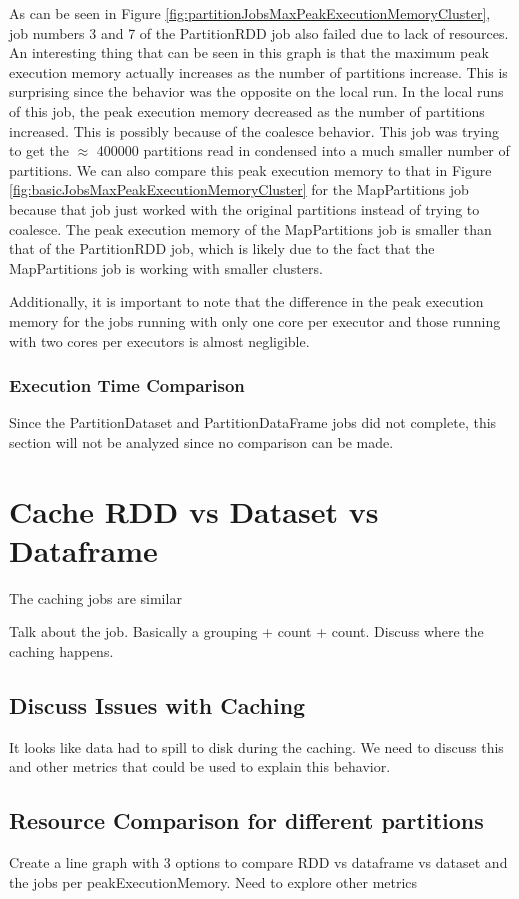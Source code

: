 \documentclass[conference]{IEEEtran}
\begin{document}
As can be seen in Figure \ref{fig:partitionJobsMaxPeakExecutionMemoryCluster}, job numbers 3 and 7 of the PartitionRDD job also failed due to lack of resources.
An interesting thing that can be seen in this graph is that the maximum peak execution memory actually increases as the number of partitions increase.
This is surprising since the behavior was the opposite on the local run.
In the local runs of this job, the peak execution memory decreased as the number of partitions increased.
This is possibly because of the coalesce behavior.
This job was trying to get the $\approx$ 400000 partitions read in condensed into a much smaller number of partitions.
We can also compare this peak execution memory to that in Figure \ref{fig:basicJobsMaxPeakExecutionMemoryCluster} for the MapPartitions job because that job just worked with the original partitions instead of trying to coalesce.
The peak execution memory of the MapPartitions job is smaller than that of the PartitionRDD job, which is likely due to the fact that the MapPartitions job is working with smaller clusters.

Additionally, it is important to note that the difference in the peak execution memory for the jobs running with only one core per executor and those running with two cores per executors is almost negligible.

\subsubsection{Execution Time Comparison}
Since the PartitionDataset and PartitionDataFrame jobs did not complete, this section will not be analyzed since no comparison can be made.

\section{Cache RDD vs Dataset vs Dataframe}
The caching jobs are similar

Talk about the job. Basically a grouping + count + count.  Discuss where the caching happens.

\subsection{Discuss Issues with Caching}
It looks like data had to spill to disk during the caching. We need to discuss this and other metrics that could be used
to explain this behavior.

\subsection{Resource Comparison for different partitions}
Create a line graph with 3 options to compare RDD vs dataframe vs dataset and the jobs per peakExecutionMemory.  Need to explore other metrics
\end{document}
